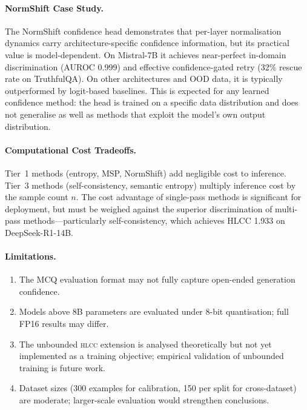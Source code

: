 \documentclass[11pt,a4paper]{article}
\newcommand{\hlcc}{\textsc{hlcc}}
\begin{document}
\paragraph{NormShift Case Study.}
The NormShift confidence head demonstrates that per-layer
normalisation dynamics carry architecture-specific confidence
information, but its practical value is model-dependent.
On Mistral-7B it achieves near-perfect in-domain discrimination
(AUROC 0.999) and effective confidence-gated retry (32\% rescue
rate on TruthfulQA).  On other architectures and OOD data, it
is typically outperformed by logit-based baselines.  This is
expected for any learned confidence method: the head is trained on
a specific data distribution and does not generalise as well as
methods that exploit the model's own output distribution.

\paragraph{Computational Cost Tradeoffs.}
Tier~1 methods (entropy, MSP, NormShift) add negligible cost to
inference.  Tier~3 methods (self-consistency, semantic entropy) multiply
inference cost by the sample count $n$.  The cost advantage of
single-pass methods is significant for deployment, but must be weighed
against the superior discrimination of multi-pass methods---particularly
self-consistency, which achieves HLCC 1.933 on DeepSeek-R1-14B.

\paragraph{Limitations.}
\begin{enumerate}[nosep]
  \item The MCQ evaluation format may not fully capture open-ended
        generation confidence.
  \item Models above 8B parameters are evaluated under 8-bit quantisation;
        full FP16 results may differ.
  \item The unbounded \hlcc{} extension is analysed theoretically but
        not yet implemented as a training objective; empirical validation
        of unbounded training is future work.
  \item Dataset sizes (300 examples for calibration, 150 per split for
        cross-dataset) are moderate; larger-scale evaluation would
        strengthen conclusions.
\end{enumerate}


\end{document}
